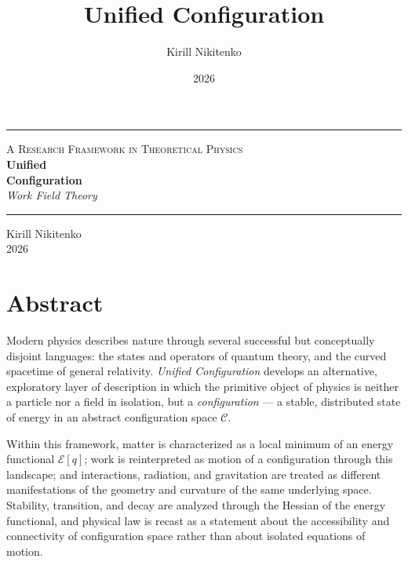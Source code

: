 \documentclass[11pt,oneside]{book}
\title{Unified Configuration}
\author{Kirill Nikitenko}
\date{2026}
\begin{document}
\begin{titlepage}
\centering
\vspace*{2.2cm}

{\color{rule}\rule{0.55\textwidth}{0.6pt}}

\vspace{1.6cm}
{\Large\scshape\color{inkblue} A Research Framework in Theoretical Physics}\\[0.8cm]

{\fontsize{30}{34}\selectfont\bfseries\color{inkblue} Unified\\[0.15cm] Configuration}\\[0.6cm]

{\Large\itshape Work Field Theory}

\vspace{1.6cm}
{\color{rule}\rule{0.55\textwidth}{0.6pt}}

\vfill

{\large Kirill Nikitenko}\\[0.3cm]
{\large 2026}

\vspace{1.2cm}
\end{titlepage}

\frontmatter

\chapter*{Abstract}

Modern physics describes nature through several successful but conceptually
disjoint languages: the states and operators of quantum theory, and the
curved spacetime of general relativity. \emph{Unified Configuration}
develops an alternative, exploratory layer of description in which the
primitive object of physics is neither a particle nor a field in isolation,
but a \emph{configuration} --- a stable, distributed state of energy in an
abstract configuration space $\mathcal{C}$.

Within this framework, matter is characterized as a local minimum of an
energy functional $\mathcal{E}[q]$; work is reinterpreted as motion of a
configuration through this landscape; and interactions, radiation, and
gravitation are treated as different manifestations of the geometry and
curvature of the same underlying space. Stability, transition, and decay are
analyzed through the Hessian of the energy functional, and physical law is
recast as a statement about the accessibility and connectivity of
configuration space rather than about isolated equations of motion.
\end{document}
